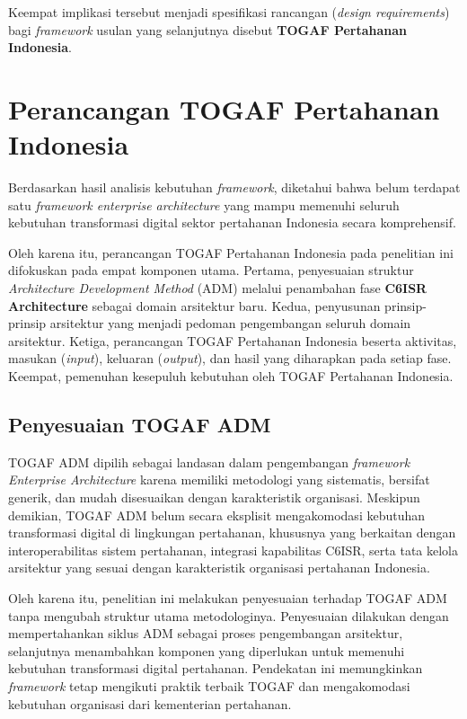 Keempat implikasi tersebut menjadi spesifikasi rancangan (\textit{design requirements}) bagi \textit{framework} usulan yang selanjutnya disebut \textbf{TOGAF Pertahanan Indonesia}.

\section{Perancangan TOGAF Pertahanan Indonesia}
\label{sec:perancangan-togaf}

Berdasarkan hasil analisis kebutuhan \textit{framework}, diketahui bahwa belum terdapat satu \textit{framework enterprise architecture} yang mampu memenuhi seluruh kebutuhan transformasi digital sektor pertahanan Indonesia secara komprehensif.

Oleh karena itu, perancangan TOGAF Pertahanan Indonesia pada penelitian ini difokuskan pada empat komponen utama. Pertama, penyesuaian struktur \textit{Architecture Development Method} (ADM) melalui penambahan fase \textbf{C6ISR Architecture} sebagai domain arsitektur baru. Kedua, penyusunan prinsip-prinsip arsitektur yang menjadi pedoman pengembangan seluruh domain arsitektur. Ketiga, perancangan TOGAF Pertahanan Indonesia beserta aktivitas, masukan (\textit{input}), keluaran (\textit{output}), dan hasil yang diharapkan pada setiap fase. Keempat, pemenuhan kesepuluh kebutuhan oleh TOGAF Pertahanan Indonesia.

\subsection{Penyesuaian TOGAF ADM}

TOGAF ADM dipilih sebagai landasan dalam pengembangan \textit{framework Enterprise Architecture} karena memiliki metodologi yang sistematis, bersifat generik, dan mudah disesuaikan dengan karakteristik organisasi. Meskipun demikian, TOGAF ADM belum secara eksplisit mengakomodasi kebutuhan transformasi digital di lingkungan pertahanan, khususnya yang berkaitan dengan interoperabilitas sistem pertahanan, integrasi kapabilitas C6ISR, serta tata kelola arsitektur yang sesuai dengan karakteristik organisasi pertahanan Indonesia.

Oleh karena itu, penelitian ini melakukan penyesuaian terhadap TOGAF ADM tanpa mengubah struktur utama metodologinya. Penyesuaian dilakukan dengan mempertahankan siklus ADM sebagai proses pengembangan arsitektur, selanjutnya menambahkan komponen yang diperlukan untuk memenuhi kebutuhan transformasi digital pertahanan. Pendekatan ini memungkinkan \textit{framework} tetap mengikuti praktik terbaik TOGAF dan mengakomodasi kebutuhan organisasi dari kementerian pertahanan.

